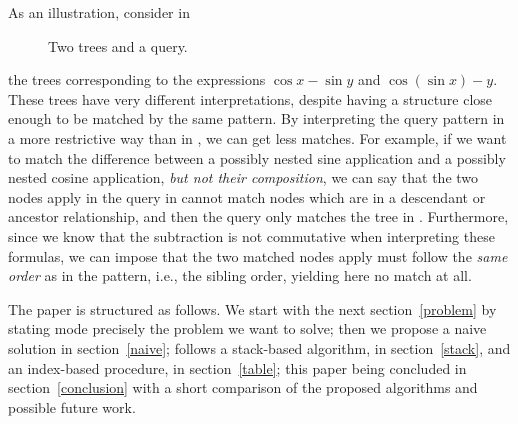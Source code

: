 As an illustration, consider in 
\begin{figure}
\centering
{}
\qquad
{}
\qquad
{}
\caption{Two \MathML trees and a query.\label{fig:mathml}}
\end{figure}
the \MathML trees corresponding to the expressions \(\cos x - \sin y\)
and \(\cos(\sin x) - y\). These trees have very different
interpretations, despite having a structure close enough to be matched
by the same pattern. By interpreting the query pattern in a more
restrictive way than in \XPath, we can get less matches. For example,
if we want to match the difference between a possibly nested sine
application and a possibly nested cosine application, \emph{but not
  their composition}, we can say that the two nodes \textsf{apply} in
the query in  cannot match nodes which are in a
descendant or ancestor relationship, and then the query only matches
the tree in . Furthermore, since we know that
the subtraction is not commutative when interpreting these formulas,
we can impose that the two matched nodes \textsf{apply} must follow
the \emph{same order} as in the pattern, i.e., the sibling order,
yielding here no match at all.

The paper is structured as follows. We start with the next
section~\ref{problem} by stating mode precisely the problem we want to
solve; then we propose a naive solution in section~\ref{naive};
follows a stack\hyp{}based algorithm, in section~\ref{stack}, and an
index\hyp{}based procedure, in section~\ref{table}; this paper being
concluded in section~\ref{conclusion} with a short comparison of the
proposed algorithms and possible future work.
